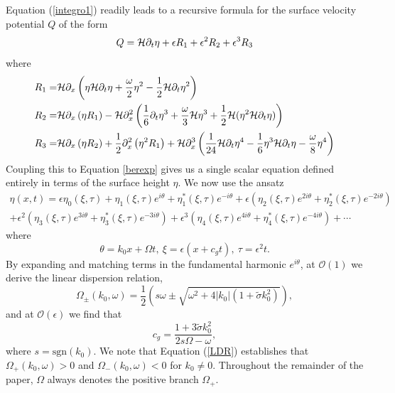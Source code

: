 \documentclass{JFM_Style/jfm}
\begin{document}
Equation (\ref{integro1}) readily leads to a recursive formula for the surface velocity potential $Q$ of the form 
\begin{equation}
Q = \mathcal{H}\partial_{t}\eta + \epsilon R_{1} + \epsilon^{2} R_{2} + \epsilon^{3} R_{3}
\label{Qexp}
\end{equation}
where
\begin{align*}
R_{1}= & \mathcal{H}\partial_{x}\left(\eta\mathcal{H}\partial_{t}\eta+ \frac{\omega}{2}\eta^{2} - \frac{1}{2}\mathcal{H}\partial_{t}\eta^{2} \right)\\
R_{2}= & \mathcal{H}\partial_{x}\left(\eta R_{1} \right) - \mathcal{H}\partial_{x}^{2}\left(\frac{1}{6}\partial_{t}\eta^{3} + \frac{\omega}{3}\mathcal{H}\eta^{3} + \frac{1}{2}\mathcal{H}(\eta^{2}\mathcal{H}\partial_{t}\eta)\right)\\
R_{3} = & \mathcal{H}\partial_{x}\left(\eta R_{2} \right) + \frac{1}{2}\partial_{x}^{2}\left(\eta^{2}R_{1}\right) + \mathcal{H}\partial_{x}^{3}\left(\frac{1}{24}\mathcal{H}\partial_{t}\eta^{4} - \frac{1}{6}\eta^{3}\mathcal{H}\partial_{t}\eta - \frac{\omega}{8}\eta^{4}\right)  
\end{align*}
Coupling this to Equation \eqref{berexp} gives us a single scalar equation defined entirely in terms of the surface height $\eta$.  We now use the ansatz
\begin{multline}
\eta(x,t) = \epsilon \eta_{0}(\xi,\tau) + \eta_{1}(\xi,\tau)e^{i\theta} +  \eta_{1}^{\ast}(\xi,\tau)e^{-i\theta} + \epsilon\left(\eta_{2}(\xi,\tau)e^{2i\theta} +  \eta_{2}^{\ast}(\xi,\tau)e^{-2i\theta}\right) \\
+ \epsilon^{2}\left(\eta_{3}(\xi,\tau)e^{3i\theta} +  \eta_{3}^{\ast}(\xi,\tau)e^{-3i\theta}\right)  + \epsilon^{3}\left(\eta_{4}(\xi,\tau)e^{4i\theta} +  \eta_{4}^{\ast}(\xi,\tau)e^{-4i\theta}\right) + \cdots
\label{nlssurfexp}
\end{multline}
where
\[
\theta = k_{0}x + \Omega t, ~ \xi = \epsilon(x + c_{g}t), ~ \tau = \epsilon^{2}t.
\]
By expanding and matching terms in the fundamental harmonic $e^{i\theta}$, at $\mathcal{O}(1)$ we derive the linear dispersion relation,
\begin{equation}
\Omega_{\pm}(k_{0},\omega)  = \frac{1}{2}\left(s\omega \pm \sqrt{\omega^{2} + 4|k_{0}|(1+\tilde{\sigma}k_{0}^{2})}\right),
\label{LDR}
\end{equation}
and at $\mathcal{O}(\epsilon)$ we find that 
\[
c_{g} = \frac{1+3\tilde{\sigma}k_{0}^{2}}{2s\Omega - \omega},
\]
where $s=\mbox{sgn}(k_{0})$.  We note that Equation (\ref{LDR}) establishes that $\Omega_{+}(k_{0},\omega) > 0$ and $\Omega_{-}(k_{0},\omega) < 0$ for $k_{0}\neq0$.  Throughout the remainder of the paper, $\Omega$ always denotes the positive branch $\Omega_{+}$.  
\end{document}
